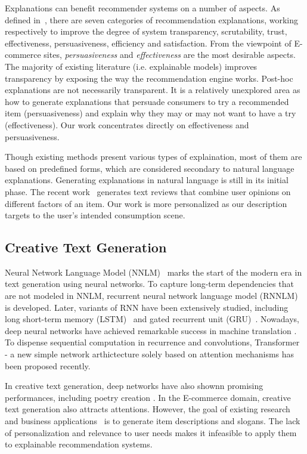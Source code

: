 \documentclass[sigconf]{acmart}
\begin{document}
Explanations can benefit recommender systems on a number of aspects. As defined in~\cite{Tintarev2011Designing}, there are seven categories of recommendation explanations, working respectively to improve the degree of system transparency, scrutability, trust, effectiveness, persuasiveness, efficiency and satisfaction. 
From the viewpoint of E-commerce sites, \textit{persuasiveness} and \textit{effectiveness} are the most desirable aspects. %
The majority of existing literature (i.e. explainable models) improves transparency by exposing the way the recommendation engine works. Post-hoc explanations are not necessarily transparent. It is a relatively unexplored area as how to generate explanations that persuade consumers to try a recommended item (persuasiveness) and explain why they may or may not want to have a try (effectiveness). Our work concentrates directly on effectiveness and persuasiveness. 

Though existing methods present various types of explaination, most of them are based on predefined forms, which are considered secondary to natural language explanations. Generating explanations in natural language is still in its initial phase. The recent work~\cite{Costa2018Automatic} generates text reviews that combine user opinions on different factors of an item. Our work is more personalized as our description targets to the user's intended consumption scene. 

\subsection{Creative Text Generation}
Neural Network Language Model (NNLM)~\cite{Bengio2003neural} marks the start of the modern era in text generation using neural networks. To capture long-term dependencies that are not modeled in NNLM, recurrent neural network language model (RNNLM)~\cite{} is developed. Later, variants of RNN have been extensively studied, including long short-term memory (LSTM)~\cite{} and gated recurrent unit (GRU)~\cite{}. Nowadays, deep neural networks have achieved remarkable success in machine translation \cite{Kalchbrenner2016Neural,Zhou2016Deep,Wu2016Google}. To dispense sequential computation in recurrence and convolutions, Transformer~\cite{vaswani2017attention}  - a new simple network arthictecture solely based on attention mechanisms has been proposed recently.


In creative text generation, deep networks have also shownn promising performances, including poetry creation \cite{Colton2012Full,Oliveira2015Tra,Ghazvininejad2016Generating,Yi2017Generating,Zhang2014Chinese,wang2016chinese}. In the E-commerce domain, creative text generation also attracts attentions. However, the goal of existing research~\cite{ozbal2013brainsup,munigala2018persuaide} and business applications~\cite{slogan} is to generate item descriptions and slogans. The lack of personalization and relevance to user needs makes it infeasible to apply them to explainable recommendation systems.
\end{document}
